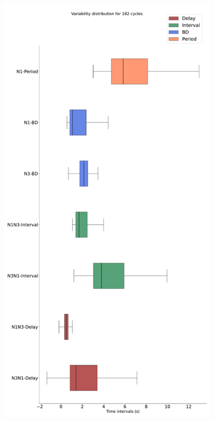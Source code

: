 \begin{figure}[htbp]
\begin{minipage}[b]{0.45\textwidth}
		\includegraphics[width=\textwidth]{./invariants/data/SUSSEX/prep1/images/spontaneous_2phases_boxplot.pdf}
	\end{minipage}
	\begin{minipage}[b]{0.53\textwidth}

\end{minipage}
\end{figure}
